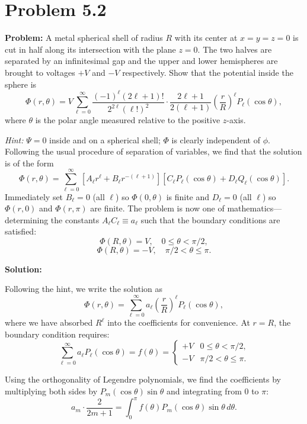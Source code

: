 \documentclass[12pt]{article}
\begin{document}
\section*{Problem 5.2}

\textbf{Problem:} A metal spherical shell of radius $R$ with its center at $x = y = z = 0$ is cut in half along its intersection with the plane $z = 0$. The two halves are separated by an infinitesimal gap and the upper and lower hemispheres are brought to voltages $+V$ and $-V$ respectively. Show that the potential inside the sphere is
\[
\Phi(r, \theta) = V\sum_{\ell=0}^{\infty} \frac{(-1)^\ell (2\ell+1)!}{2^{2\ell}(\ell!)^2} \cdot \frac{2\ell+1}{2(\ell+1)} \left(\frac{r}{R}\right)^\ell P_\ell(\cos\theta),
\]
where $\theta$ is the polar angle measured relative to the positive $z$-axis.

\emph{Hint:} $\Psi=0$ inside and on a spherical shell; $\Phi$ is clearly independent of $\phi$. Following the usual procedure of separation of variables, we find that the solution is of the form
\[
\Phi(r,\theta) = \sum_{\ell=0}^{\infty} \left[A_\ell r^\ell + B_\ell r^{-(\ell+1)}\right] \left[C_\ell P_\ell(\cos\theta) + D_\ell Q_\ell(\cos\theta)\right].
\]
Immediately set $B_\ell = 0$ (all $\ell$) so $\Phi(0,\theta)$ is finite and $D_\ell = 0$ (all $\ell$) so $\Phi(r,0)$ and $\Phi(r,\pi)$ are finite. The problem is now one of mathematics---determining the constants $A_\ell C_\ell \equiv a_\ell$ such that the boundary conditions are satisfied:
\[
\Phi(R,\theta) = V, \quad 0 \leq \theta < \pi/2,
\]
\[
\Phi(R,\theta) = -V, \quad \pi/2 < \theta \leq \pi.
\]

\bigskip
\textbf{Solution:}

Following the hint, we write the solution as
\[
\Phi(r,\theta) = \sum_{\ell=0}^{\infty} a_\ell \left(\frac{r}{R}\right)^\ell P_\ell(\cos\theta),
\]
where we have absorbed $R^\ell$ into the coefficients for convenience. At $r = R$, the boundary condition requires:
\[
\sum_{\ell=0}^{\infty} a_\ell P_\ell(\cos\theta) = f(\theta) = \begin{cases} +V & 0 \leq \theta < \pi/2, \\ -V & \pi/2 < \theta \leq \pi. \end{cases}
\]

Using the orthogonality of Legendre polynomials, we find the coefficients by multiplying both sides by $P_m(\cos\theta)\sin\theta$ and integrating from $0$ to $\pi$:
\[
a_m \cdot \frac{2}{2m+1} = \int_0^{\pi} f(\theta) P_m(\cos\theta)\sin\theta\,d\theta.
\]
\end{document}
